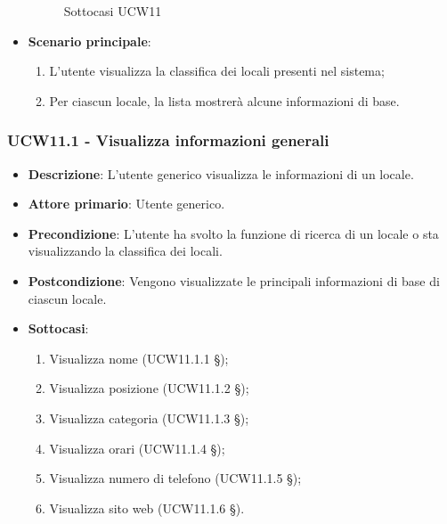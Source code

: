\begin{itemize}
\begin{figure}[!h]
		\caption{Sottocasi UCW11}
	\end{figure}    
    \item \textbf{Scenario principale}: 
    \begin{enumerate}
	\item L'utente visualizza la classifica dei locali presenti nel sistema;
    \item Per ciascun locale, la lista mostrerà alcune informazioni di base.
    \end{enumerate}
\end{itemize}

\subsubsection{UCW11.1 - Visualizza informazioni generali}
\begin{itemize}
    \item \textbf{Descrizione}: L'utente generico visualizza le informazioni di un locale.
    \item \textbf{Attore primario}: Utente generico.
    \item \textbf{Precondizione}: L'utente ha svolto la funzione di ricerca di un locale o sta visualizzando la classifica dei locali.
    \item \textbf{Postcondizione}: Vengono visualizzate le principali informazioni di base di ciascun locale.
	\item \textbf{Sottocasi}:
	\begin{enumerate}
		\item Visualizza nome (UCW11.1.1 \S{});
		\item Visualizza posizione (UCW11.1.2 \S{});
		\item Visualizza categoria (UCW11.1.3 \S{});
		\item Visualizza orari (UCW11.1.4 \S{});
		\item Visualizza numero di telefono (UCW11.1.5 \S{});
		\item Visualizza sito web (UCW11.1.6 \S{}).
	\end{enumerate}
	\begin{figure}[!h]
	\centering

\end{figure}
\end{itemize}
